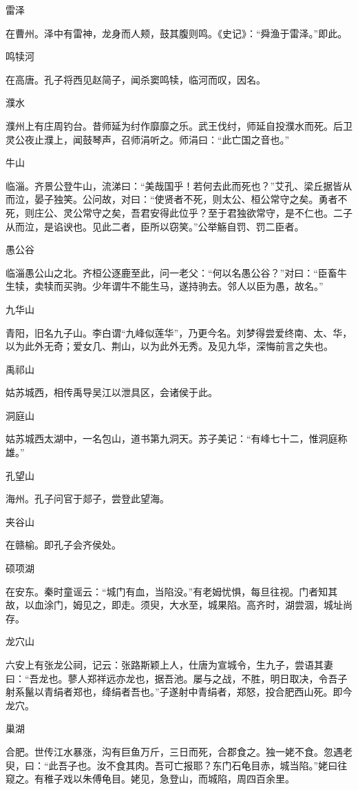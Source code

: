\documentclass[a4paper,12pt,UTF8,twoside]{ctexbook}
\begin{document}
雷泽

在曹州。泽中有雷神，龙身而人颊，鼓其腹则鸣。《史记》：“舜渔于雷泽。”即此。

鸣犊河

在高唐。孔子将西见赵简子，闻杀窦鸣犊，临河而叹，因名。

濮水

濮州上有庄周钓台。昔师延为纣作靡靡之乐。武王伐纣，师延自投濮水而死。后卫灵公夜止濮上，闻鼓琴声，召师涓听之。师涓曰：“此亡国之音也。”

牛山

临淄。齐景公登牛山，流涕曰：“美哉国乎！若何去此而死也？”艾孔、梁丘据皆从而泣，晏子独笑。公问故，对曰：“使贤者不死，则太公、桓公常守之矣。勇者不死，则庄公、灵公常守之矣，吾君安得此位乎？至于君独欲常守，是不仁也。二子从而泣，是谄谀也。见此二者，臣所以窃笑。”公举觞自罚、罚二臣者。

愚公谷

临淄愚公山之北。齐桓公逐鹿至此，问一老父：“何以名愚公谷？”对曰：“臣畜牛生犊，卖犊而买驹。少年谓牛不能生马，遂持驹去。邻人以臣为愚，故名。”

九华山

青阳，旧名九子山。李白谓“九峰似莲华”，乃更今名。刘梦得尝爱终南、太、华，以为此外无奇；爱女几、荆山，以为此外无秀。及见九华，深悔前言之失也。

禹祁山

姑苏城西，相传禹导吴江以泄具区，会诸侯于此。

洞庭山

姑苏城西太湖中，一名包山，道书第九洞天。苏子美记：“有峰七十二，惟洞庭称雄。”

孔望山

海州。孔子问官于郯子，尝登此望海。

夹谷山

在赣榆。即孔子会齐侯处。

硕项湖

在安东。秦时童谣云：“城门有血，当陷没。”有老姆忧惧，每旦往视。门者知其故，以血涂门，姆见之，即走。须臾，大水至，城果陷。高齐时，湖尝涸，城址尚存。

龙穴山

六安上有张龙公祠，记云：张路斯颖上人，仕唐为宣城令，生九子，尝语其妻曰：“吾龙也。蓼人郑祥远亦龙也，据吾池。屡与之战，不胜，明日取决，令吾子射系鬣以青绢者郑也，绛绢者吾也。”子遂射中青绢者，郑怒，投合肥西山死。即今龙穴。

巢湖

合肥。世传江水暴涨，沟有巨鱼万斤，三日而死，合郡食之。独一姥不食。忽遇老臾，曰：“此吾子也。汝不食其肉。吾可亡报耶？东门石龟目赤，城当陷。”姥曰往窥之。有稚子戏以朱傅龟目。姥见，急登山，而城陷，周四百余里。
\end{document}
